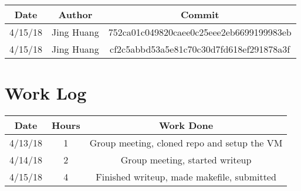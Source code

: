 \documentclass[english,10pt,letterpaper,onecolumn]{IEEEtran}
\begin{document}
  \begin{center}
   \begin{tabular}{||c c c ||} 
   \hline
   Date & Author & Commit \\ 
   \hline\hline
   4/15/18 & Jing Huang & 752ca01c049820caee0c25eee2eb6699199983eb\\ 
   \hline
   4/15/18 & Jing Huang & cf2c5abbd53a5e81c70c30d7fd618ef291878a3f\\
   \hline
  \end{tabular}
  \end{center}
  
  \section{Work Log}
  
  \begin{center}
   \begin{tabular}{||c c c ||} 
   \hline
   Date & Hours & Work Done\\ 
   \hline\hline
   4/13/18 & 1 & Group meeting, cloned repo and setup the VM\\ 
   \hline
    4/14/18 & 2 & Group meeting, started writeup\\ 
   \hline
   4/15/18 & 4 & Finished writeup, made makefile, submitted\\
   [1ex] 
   \hline
  \end{tabular}
  \end{center}
  
  
  
\end{document}
